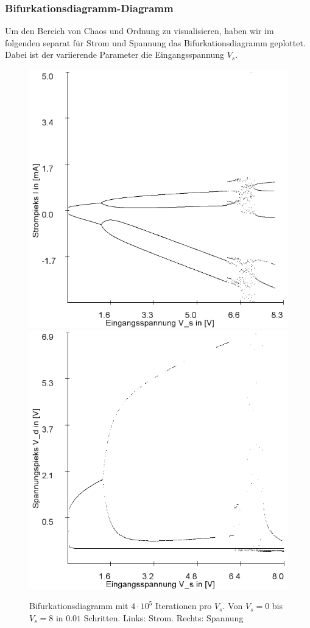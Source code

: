 \documentclass[12pt,a4paper]{article}
\begin{document}
\subsubsection{Bifurkationsdiagramm-Diagramm}
Um den Bereich von Chaos und Ordnung zu visualisieren, haben wir im folgenden separat für Strom und Spannung das Bifurkationsdiagramm geplottet. Dabei ist der variierende Parameter die Eingangsspannung $V_s$.
\begin{figure}[!htbp]
\includegraphics[scale=0.4]{schwing-bifurc-von-0-8-in-0,01schritten-400k-strom}
\includegraphics[scale=0.4]{schwing-bifurc-von-0-8-in-0,01schritten-400k-spannung}
\caption{Bifurkationsdiagramm mit $4\cdot10^5$ Iterationen pro $V_s$. Von $V_s=0$ bis $V_s=8$ in $0.01$ Schritten. Links: Strom. Rechts: Spannung}
\label{fig:ldr-bifurc}
\end{figure}
\end{document}
